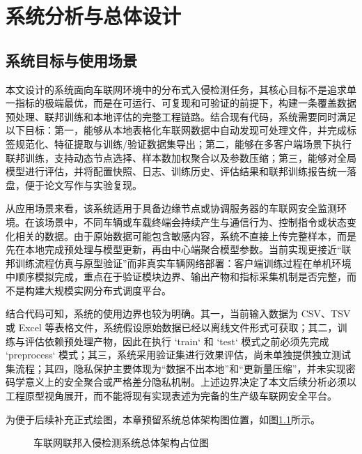 \chapter{系统分析与总体设计}
\label{cha:system-design}

\section{系统目标与使用场景}
\label{sec:system-design-goals}

本文设计的系统面向车联网环境中的分布式入侵检测任务，其核心目标不是追求单一指标的极端最优，而是在可运行、可复现和可验证的前提下，构建一条覆盖数据预处理、联邦训练和本地评估的完整工程链路。结合现有代码，系统需要同时满足以下目标：第一，能够从本地表格化车联网数据中自动发现可处理文件，并完成标签规范化、特征提取与训练/验证数据集导出；第二，能够在多客户端场景下执行联邦训练，支持动态节点选择、样本数加权聚合以及参数压缩；第三，能够对全局模型进行评估，并将配置快照、日志、训练历史、评估结果和联邦训练报告统一落盘，便于论文写作与实验复现。

从应用场景来看，该系统适用于具备边缘节点或协调服务器的车联网安全监测环境。在该场景中，不同车辆或车载终端会持续产生与通信行为、控制指令或状态变化相关的数据。由于原始数据可能包含敏感内容，系统不直接上传完整样本，而是先在本地完成预处理与模型更新，再由中心端聚合模型参数。当前实现更接近“联邦训练流程仿真与原型验证”而非真实车辆网络部署：客户端训练过程在单机环境中顺序模拟完成，重点在于验证模块边界、输出产物和指标采集机制是否完整，而不是构建大规模实网分布式调度平台。

结合代码可知，系统的使用边界也较为明确。其一，当前输入数据为 CSV、TSV 或 Excel 等表格文件，系统假设原始数据已经以离线文件形式可获取；其二，训练与评估依赖预处理产物，因此在执行 `train` 和 `test` 模式之前必须先完成 `preprocess` 模式；其三，系统采用验证集进行效果评估，尚未单独提供独立测试集流程；其四，隐私保护主要体现为“数据不出本地”和“更新量压缩”，并未实现密码学意义上的安全聚合或严格差分隐私机制。上述边界决定了本文后续分析必须以工程原型视角展开，而不能将现有实现表述为完备的生产级车联网安全平台。

为便于后续补充正式绘图，本章预留系统总体架构图位置，如图\ref{fig:system-architecture-placeholder}所示。

\begin{figure}[htbp]
    \centering
    \caption{车联网联邦入侵检测系统总体架构占位图}
    \label{fig:system-architecture-placeholder}
\end{figure}

